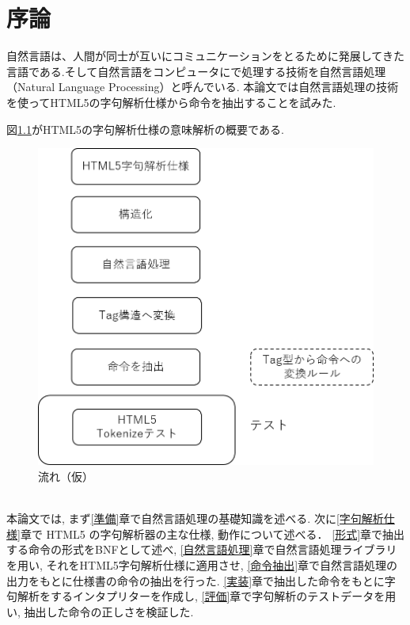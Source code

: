 \documentclass[uplatex,a4j]{jsreport}
\begin{document}
\chapter{序論}

自然言語は、人間が同士が互いにコミュニケーションをとるために発展してきた言語である.そして自然言語をコンピュータにで処理する技術を自然言語処理（Natural Language Processing）と呼んでいる.
本論文では自然言語処理の技術を使ってHTML5の字句解析仕様から命令を抽出することを試みた.

図\ref{流れ}がHTML5の字句解析仕様の意味解析の概要である.\\
\begin{figure}[h]
    \centering
    \includegraphics[keepaspectratio, scale=0.6]
         {figure/流れ.png}
    \caption{流れ（仮）}
    \label{流れ}
\end{figure}
\\
本論文では, まず\ref{準備}章で自然言語処理の基礎知識を述べる.
次に\ref{字句解析仕様}章で HTML5 の字句解析器の主な仕様, 動作について述べる．
\ref{形式}章で抽出する命令の形式をBNFとして述べ, 
\ref{自然言語処理}章で自然言語処理ライブラリを用い, それをHTML5字句解析仕様に適用させ, 
\ref{命令抽出}章で自然言語処理の出力をもとに仕様書の命令の抽出を行った. 
\ref{実装}章で抽出した命令をもとに字句解析をするインタプリターを作成し, 
\ref{評価}章で字句解析のテストデータを用い, 抽出した命令の正しさを検証した.
\end{document}
